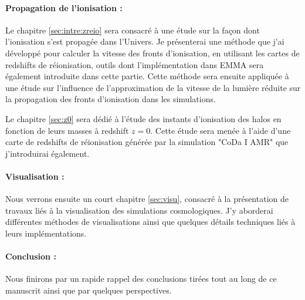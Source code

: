 \paragraph{Propagation de l'ionisation :}
Le chapitre \ref{sec:intre:zreio} sera consacré à une étude sur la façon dont l'ionisation s'est propagée dans l'Univers.
Je présenterai une méthode que j'ai développé pour calculer la vitesse des fronts d'ionisation, en utilisant les cartes de redshifts de réionisation, outils dont l'implémentation dans EMMA sera également introduite dans cette partie.
Cette méthode sera ensuite appliquée à une étude sur l'influence de l'approximation de la vitesse de la lumière réduite sur la propagation des fronts d'ionisation dans les simulations.

Le chapitre \ref{sec:z0} sera dédié à l'étude des instants d'ionisation des halos en fonction de leurs masses à redshift $z=0$.
Cette étude sera menée à l'aide d'une carte de redshifts de réionisation générée par la simulation "CoDa I AMR" que j'introduirai également.

\paragraph{Visualisation : }
Nous verrons ensuite un court chapitre  \ref{sec:visu}, consacré à la présentation de travaux liés à la visualisation des simulations cosmologiques.
J'y aborderai différentes méthodes de visualisations ainsi que quelques détails techniques liés à leurs implémentations.

\paragraph{Conclusion :}
Nous finirons par un rapide rappel des conclusions tirées tout au long de ce manuscrit ainsi que par quelques perspectives.

